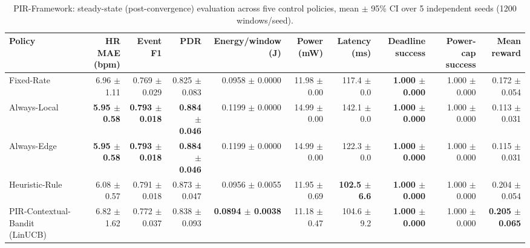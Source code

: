 \begin{table}[t]
\centering
\caption{PIR-Framework: steady-state (post-convergence) evaluation across five control policies, mean $\pm$ 95\% CI over 5 independent seeds (1200 windows/seed).}
\label{tab:pir_overall_multiseed}
\begin{tabular}{lrrrrrrrrr}
\toprule
Policy & HR MAE (bpm) & Event F1 & PDR & Energy/window (J) & Power (mW) & Latency (ms) & Deadline success & Power-cap success & Mean reward \\
\midrule
Fixed-Rate & 6.96 $\pm$ 1.11 & 0.769 $\pm$ 0.029 & 0.825 $\pm$ 0.083 & 0.0958 $\pm$ 0.0000 & 11.98 $\pm$ 0.00 & 117.4 $\pm$ 0.0 & \textbf{1.000 $\pm$ 0.000} & 1.000 $\pm$ 0.000 & 0.172 $\pm$ 0.054 \\
Always-Local & \textbf{5.95 $\pm$ 0.58} & \textbf{0.793 $\pm$ 0.018} & \textbf{0.884 $\pm$ 0.046} & 0.1199 $\pm$ 0.0000 & 14.99 $\pm$ 0.00 & 142.1 $\pm$ 0.0 & \textbf{1.000 $\pm$ 0.000} & 1.000 $\pm$ 0.000 & 0.113 $\pm$ 0.031 \\
Always-Edge & \textbf{5.95 $\pm$ 0.58} & \textbf{0.793 $\pm$ 0.018} & \textbf{0.884 $\pm$ 0.046} & 0.1199 $\pm$ 0.0000 & 14.99 $\pm$ 0.00 & 122.3 $\pm$ 0.0 & \textbf{1.000 $\pm$ 0.000} & 1.000 $\pm$ 0.000 & 0.115 $\pm$ 0.031 \\
Heuristic-Rule & 6.08 $\pm$ 0.57 & 0.791 $\pm$ 0.018 & 0.873 $\pm$ 0.047 & 0.0956 $\pm$ 0.0055 & 11.95 $\pm$ 0.69 & \textbf{102.5 $\pm$ 6.6} & \textbf{1.000 $\pm$ 0.000} & 1.000 $\pm$ 0.000 & 0.204 $\pm$ 0.054 \\
PIR-Contextual-Bandit (LinUCB) & 6.82 $\pm$ 1.62 & 0.772 $\pm$ 0.037 & 0.838 $\pm$ 0.093 & \textbf{0.0894 $\pm$ 0.0038} & 11.18 $\pm$ 0.47 & 104.6 $\pm$ 9.2 & \textbf{1.000 $\pm$ 0.000} & 1.000 $\pm$ 0.000 & \textbf{0.205 $\pm$ 0.065} \\
\bottomrule
\end{tabular}
\end{table}